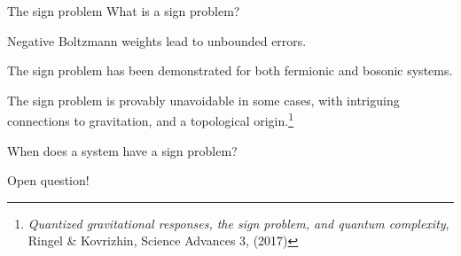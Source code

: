 \documentclass[10pt]{beamer}
\begin{document}
\begin{frame}{The sign problem}
What is a sign problem?

\begin{center}
    Negative Boltzmann weights lead to unbounded errors.
\end{center}

The sign problem has been demonstrated for both fermionic and bosonic systems. 

The sign problem is provably unavoidable in some cases, with intriguing connections to gravitation, and a topological origin.\footnote{\emph{Quantized gravitational responses, the sign problem, and quantum complexity}, Ringel \& Kovrizhin, Science Advances 3, (2017)}

When does a system have a sign problem? 

\begin{center}
Open question!
\end{center}



\end{frame}
\end{document}
